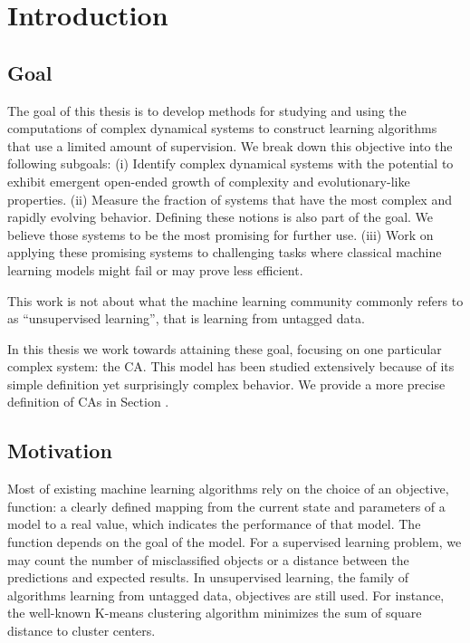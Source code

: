 \chapter{Introduction}


\section{Goal}

The goal of this thesis is to develop methods for studying and using the
computations of complex dynamical systems to construct learning algorithms that
use a limited amount of supervision. We break down this objective into the
following subgoals: (i) Identify complex dynamical systems with the potential to
exhibit emergent open-ended growth of complexity and evolutionary-like
properties. (ii) Measure the fraction of systems that have the most complex and
rapidly evolving behavior. Defining these notions is also part of the goal. We
believe those systems to be the most promising for further use. (iii) Work on
applying these promising systems to challenging tasks where classical machine
learning models might fail or may prove less efficient.

This work is not about what the machine learning community commonly refers to as
``unsupervised learning'', that is learning from untagged data.

In this thesis we work towards attaining these goal, focusing on one particular
complex system: the \acl{CA}. This model has been studied extensively
because of its simple definition yet surprisingly complex behavior. We provide a
more precise definition of \aclp{CA} in Section .


\section{Motivation}

Most of existing machine learning algorithms rely on the choice of an objective,
function: a clearly defined mapping from the current state and parameters of a
model to a real value, which indicates the performance of that model. The
function depends on the goal of the model. For a supervised learning problem, we
may count the number of misclassified objects or a distance between the
predictions and expected results. In unsupervised learning, the family of
algorithms learning from untagged data, objectives are still used. For instance,
the well-known K-means clustering algorithm minimizes the sum of square distance
to cluster centers.

